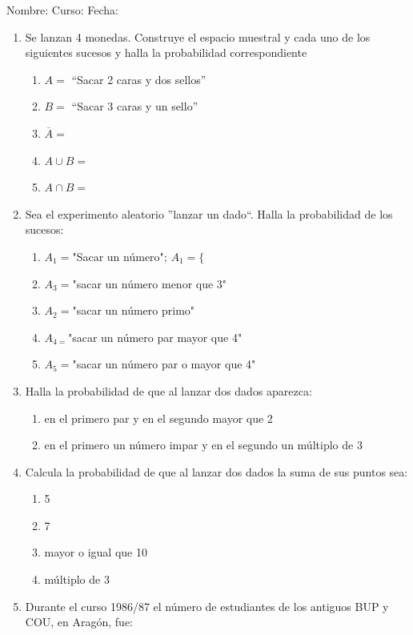 \documentclass[fleqn]{article}
\newcommand{\LineaNombre}{%
\par
\vspace{\baselineskip}
Nombre:\hrulefill \; Curso: \underline{\hspace*{48pt}} \; Fecha: \underline{\hspace*{2.5cm}} \relax
\par}
\begin{document}
\LineaNombre
\begin{enumerate}
 \item Se lanzan 4 monedas. Construye el espacio muestral y cada uno de los siguientes sucesos y halla la probabilidad correspondiente
 \begin{enumerate}
 \item $A=$ ``Sacar 2 caras y dos sellos'' \noanswer
 \item $B=$ ``Sacar 3 caras y un sello'' \noanswer
 \item $\overline{A}=$ \noanswer
 \item $A\cup B=$ \noanswer
 \item $A\cap B=$ \noanswer
 \end{enumerate}
 \item Sea el experimento aleatorio ''lanzar un dado``. Halla la probabilidad de los sucesos:
\begin{enumerate}
\item $A_{1}=$"Sacar un número"; $A_{1}=\{$ \noanswer
\item $A_{3}=$"sacar un número menor que 3" \noanswer
\item $A_{2}=$"sacar un número primo" \noanswer
\item $A_{4=}$"sacar un número par mayor que 4" \noanswer
\item $A_{5}=$"sacar un número par o mayor que 4"\noanswer
\end{enumerate}
  \newpage
\item Halla la probabilidad de que al lanzar dos dados aparezca:
\begin{enumerate}
 \item en el primero par y en el segundo mayor que 2 \noanswer
\item en el primero un número impar y en el segundo un múltiplo de 3 \noanswer
\end{enumerate}
\item Calcula la probabilidad de que al lanzar dos dados la suma de sus puntos sea:
\begin{enumerate}
\item 5 \noanswer
\item 7 \noanswer
\item mayor o igual que 10 \noanswer
\item múltiplo de 3 \noanswer
\end{enumerate}
\item Durante el curso 1986/87 el número de estudiantes de los antiguos BUP y COU, en Aragón, fue:


\end{enumerate}
\end{document}

